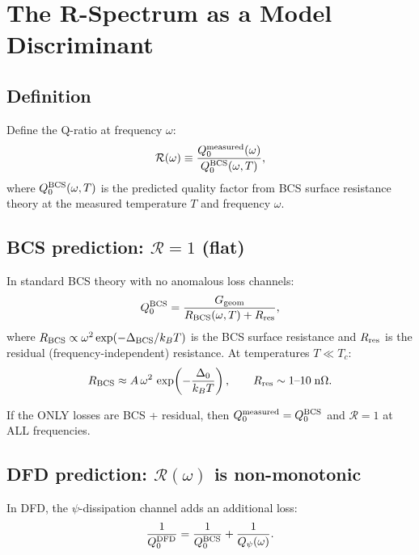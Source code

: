 \documentclass[11pt]{article}
\theoremstyle{definition}
\theoremstyle{remark}
\begin{document}
\section{The R-Spectrum as a Model Discriminant}

\subsection{Definition}

Define the Q-ratio at frequency $\omega$:
\begin{equation}
\mathcal{R}(\omega) \equiv \frac{Q_0^{\rm measured}(\omega)}
{Q_0^{\rm BCS}(\omega, T)},
\label{eq:R-def}
\end{equation}
where $Q_0^{\rm BCS}(\omega, T)$ is the predicted quality factor from
BCS surface resistance theory at the measured temperature $T$ and
frequency $\omega$.

\subsection{BCS prediction: $\mathcal{R} = 1$ (flat)}

In standard BCS theory with no anomalous loss channels:
\begin{equation}
Q_0^{\rm BCS} = \frac{G_{\rm geom}}{R_{\rm BCS}(\omega, T)
+ R_{\rm res}},
\end{equation}
where $R_{\rm BCS} \propto \omega^2 \exp(-\Delta_{\rm BCS}/k_B T)$
is the BCS surface resistance and $R_{\rm res}$ is the residual
(frequency-independent) resistance. At temperatures $T \ll T_c$:
\begin{equation}
R_{\rm BCS} \approx A\,\omega^2\,\exp\!\left(-\frac{\Delta_0}{k_B T}\right),
\qquad R_{\rm res} \sim 1\text{--}10\;\text{n}\Omega.
\end{equation}

If the ONLY losses are BCS + residual, then $Q_0^{\rm measured}
= Q_0^{\rm BCS}$ and $\mathcal{R} = 1$ at ALL frequencies.

\subsection{DFD prediction: $\mathcal{R}(\omega)$ is non-monotonic}

In DFD, the $\psi$-dissipation channel adds an additional loss:
\begin{equation}
\frac{1}{Q_0^{\rm DFD}} = \frac{1}{Q_0^{\rm BCS}}
+ \frac{1}{Q_\psi(\omega)}.
\end{equation}
\end{document}
